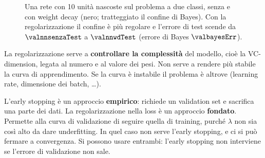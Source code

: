 \begin{figure}[ht]
\centering
{}
\caption{Una rete con 10 unità nascoste sul problema a due classi, senza e con weight decay (nero; tratteggiato il
confine di Bayes). Con la regolarizzazione il confine è più regolare e l'errore di test scende da
$\valnnsenzaTest$ a $\valnnwdTest$ (errore di Bayes $\valbayesErr$).}
\label{fig:weight-decay}
\end{figure}

\begin{attenzione}
La regolarizzazione serve a \textbf{controllare la complessità} del modello, cioè la VC-dimension, legata al
numero e al valore dei pesi. Non serve a rendere più stabile la curva di apprendimento. Se la curva è instabile il
problema è altrove (learning rate, dimensione dei batch, \dots).
\end{attenzione}

\begin{idea}
L'early stopping è un approccio \textbf{empirico}: richiede un validation set e sacrifica una parte dei dati. La
regolarizzazione nella loss è un approccio \textbf{fondato}. Permette alla curva di validazione di seguire quella
di training, purché $\lambda$ non sia così alto da dare underfitting. In quel caso non serve l'early stopping, e ci
si può fermare a convergenza. Si possono usare entrambi: l'early stopping non interviene se l'errore di
validazione non sale.
\end{idea}

